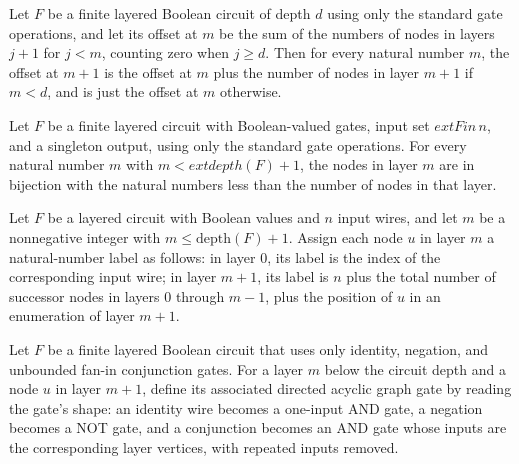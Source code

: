 \begin{theorem}
\label{BoolCircuit.LayeredCircuit.offset_succ}
\leanok
{}
Let $F$ be a finite layered Boolean circuit of depth $d$ using only the standard gate
operations, and let its offset at $m$ be the sum of the numbers of nodes in layers $j+1$
for $j<m$, counting zero when $j\ge d$. Then for every natural number $m$, the offset at
$m+1$ is the offset at $m$ plus the number of nodes in layer $m+1$ if $m<d$, and is just
the offset at $m$ otherwise.
\end{theorem}

\begin{definition}
\label{BoolCircuit.LayeredCircuit.layerEnum}
\leanok
Let $F$ be a finite layered circuit with Boolean-valued gates, input set $	ext{Fin}\,n$,
and a singleton output, using only the standard gate operations. For every natural
number $m$ with $m < 	ext{depth}(F)+1$, the nodes in layer $m$ are in bijection with the
natural numbers less than the number of nodes in that layer.
\end{definition}

\begin{definition}
\label{BoolCircuit.LayeredCircuit.layerVertex}
\leanok
{}
Let $F$ be a layered circuit with Boolean values and $n$ input wires, and let $m$ be a
nonnegative integer with $m \le \mathrm{depth}(F)+1$. Assign each node $u$ in layer $m$ a
natural-number label as follows: in layer $0$, its label is the index of the
corresponding input wire; in layer $m+1$, its label is $n$ plus the total number of
successor nodes in layers $0$ through $m-1$, plus the position of $u$ in an enumeration
of layer $m+1$.
\end{definition}

\begin{definition}
\label{BoolCircuit.LayeredCircuit.layerGate}
\leanok
{}
Let $F$ be a finite layered Boolean circuit that uses only identity, negation, and
unbounded fan-in conjunction gates. For a layer $m$ below the circuit depth and a node
$u$ in layer $m+1$, define its associated directed acyclic graph gate by reading the
gate’s shape: an identity wire becomes a one-input AND gate, a negation becomes a NOT
gate, and a conjunction becomes an AND gate whose inputs are the corresponding layer
vertices, with repeated inputs removed.
\end{definition}

